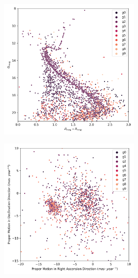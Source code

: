 \documentclass[11pt, a4paper, english]{book}
\begin{document}
\begin{figure}[H]
\begin{subfigure}{0.9\textwidth}
\begin{subfigure}[t]{0.30\textwidth}
    \end{subfigure}
    \hfill
    \begin{subfigure}[t]{0.30\textwidth}
      \centering
      \includegraphics[width=\textwidth]{../figures/ngc_2682/dec_hr_diagram_ngc_2682.png}
    \end{subfigure}
  \end{subfigure}
  \caption{NGC 2682 DEC characterization.}
  \centering
  \begin{subfigure}{0.9\textwidth}
    \centering
    \begin{subfigure}[t]{0.30\textwidth}
      \centering
      \includegraphics[width=\textwidth]{../figures/ngc_2682/dec_pm_filtered_ngc_2682.png}

\end{subfigure}
\end{subfigure}
\end{figure}
\end{document}
